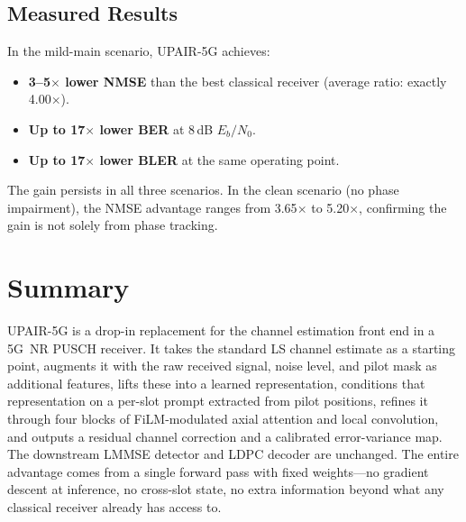 \documentclass[11pt,a4paper]{article}
\newcommand{\EbNo}{\ensuremath{E_b/N_0}}
\begin{document}
	\subsection{Measured Results}
	
	In the mild-main scenario, UPAIR-5G achieves:
	\begin{itemize}[nosep]
		\item \textbf{3--5$\times$ lower NMSE} than the best classical receiver (average ratio: exactly 4.00$\times$).
		\item \textbf{Up to 17$\times$ lower BER} at 8\,dB \EbNo{}.
		\item \textbf{Up to 17$\times$ lower BLER} at the same operating point.
	\end{itemize}
	
	The gain persists in all three scenarios.  In the clean scenario (no phase impairment), the NMSE advantage ranges from 3.65$\times$ to 5.20$\times$, confirming the gain is not solely from phase tracking.
	
	\section{Summary}
	
	UPAIR-5G is a drop-in replacement for the channel estimation front end in a 5G~NR PUSCH receiver.  It takes the standard LS channel estimate as a starting point, augments it with the raw received signal, noise level, and pilot mask as additional features, lifts these into a learned representation, conditions that representation on a per-slot prompt extracted from pilot positions, refines it through four blocks of FiLM-modulated axial attention and local convolution, and outputs a residual channel correction and a calibrated error-variance map.  The downstream LMMSE detector and LDPC decoder are unchanged.  The entire advantage comes from a single forward pass with fixed weights---no gradient descent at inference, no cross-slot state, no extra information beyond what any classical receiver already has access to.
	
\end{document}
